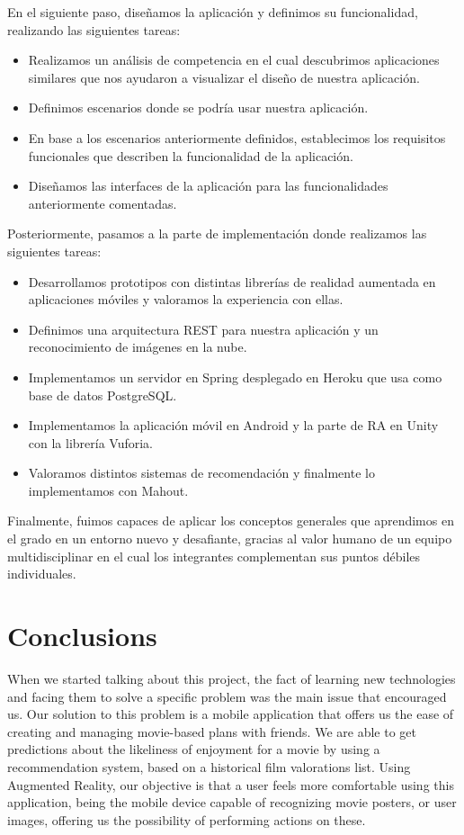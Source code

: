 En el siguiente paso, diseñamos la aplicación y definimos su funcionalidad,
 realizando las siguientes tareas:
\begin{itemize}
    \item Realizamos un análisis de competencia en el cual descubrimos
     aplicaciones similares que nos ayudaron a visualizar el diseño de nuestra
     aplicación.
    \item Definimos escenarios donde se podría usar nuestra aplicación.
    \item En base a los escenarios anteriormente definidos, establecimos los
     requisitos funcionales que describen la funcionalidad de la aplicación.
    \item Diseñamos las interfaces de la aplicación para las funcionalidades
     anteriormente comentadas.
\end{itemize}

Posteriormente, pasamos a la parte de implementación donde realizamos las
 siguientes tareas:
\begin{itemize}
    \item Desarrollamos prototipos con distintas librerías de realidad
     aumentada en aplicaciones móviles y valoramos la experiencia con ellas.
    \item Definimos una arquitectura REST para nuestra aplicación y un
     reconocimiento de imágenes en la nube.
    \item Implementamos un servidor en Spring desplegado en Heroku que usa como
     base de datos PostgreSQL.
    \item Implementamos la aplicación móvil en Android y la parte de RA en Unity
     con la librería Vuforia.
    \item Valoramos distintos sistemas de recomendación y finalmente lo
     implementamos con Mahout.
\end{itemize}

Finalmente, fuimos capaces de aplicar los conceptos generales que aprendimos
 en el grado en un entorno nuevo y desafiante, gracias al valor humano de
 un equipo multidisciplinar en el cual los integrantes complementan sus
 puntos débiles individuales. 

\section{Conclusions}
\label{makereference5.2}
When we started talking about this project, the fact of learning new technologies and facing them
to solve a specific problem was the main issue that encouraged us. 
Our solution to this problem is a mobile application that offers us the ease of 
creating and managing movie-based plans with friends. We are able to get predictions 
about the likeliness of enjoyment for a movie by using a recommendation system, based on 
a historical film valorations list. Using Augmented Reality, our objective is that a 
user feels more comfortable using this application, being the mobile device capable of recognizing 
movie posters, or user images, offering us the possibility of performing actions on these.

